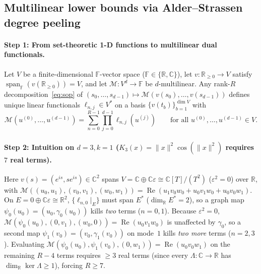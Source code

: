\documentclass[11pt,a4paper]{article}
\theoremstyle{plain}
\theoremstyle{definition}
\newcommand{\R}{\mathbb{R}}
\newcommand{\C}{\mathbb{C}}
\newcommand{\Field}{\mathbb{F}}
\newcommand{\Rnn}{\mathbb{R}_{\ge 0}}
\DeclareMathOperator{\RePart}{Re}
\DeclareMathOperator{\spanop}{span}
\begin{document}
\subsection{Multilinear lower bounds via Alder--Strassen degree peeling}\label{sec:lb}

\paragraph{Step 1: From set-theoretic 1-D functions to multilinear dual functionals.}
Let $V$ be a finite-dimensional $\Field$-vector space ($\Field \in \{\R, \C\}$), let $v : \Rnn \to V$ satisfy $\spanop_{\Field}(v(\Rnn)) = V$, and let $\mathcal{M} : V^d \to \Field$ be $d$-multilinear. Any rank-$R$ decomposition~\eqref{eq:sop} of $(s_0,\dots,s_{d-1}) \mapsto \mathcal{M}(v(s_0),\dots,v(s_{d-1}))$ defines unique linear functionals $\ell_{n,j} \in V^*$ on a basis $\{v(t_b)\}_{b=1}^{\dim V}$ with
\begin{equation}\label{eq:multilinear_decomp}
  \mathcal{M}(u^{(0)}, \dots, u^{(d-1)}) = \sum_{n=0}^{R-1} \prod_{j=0}^{d-1} \ell_{n,j}(u^{(j)}) \qquad \text{for all } u^{(0)}, \dots, u^{(d-1)} \in V.
\end{equation}

\paragraph{Step 2: Intuition on $d = 3, k = 1$ ($K_3(x) = \|x\|^2\cos(\|x\|^2)$ requires $7$ real terms).}
Here $v(s) = (e^{is}, s e^{is}) \in \C^2$ spans $V = \C \oplus \C\varepsilon \cong \C[T]/(T^2)$ ($\varepsilon^2 = 0$) over $\R$, with $\mathcal{M}((u_0, u_1), (v_0, v_1), (w_0, w_1)) = \RePart(u_1 v_0 w_0 + u_0 v_1 w_0 + u_0 v_0 w_1)$. On $E = 0 \oplus \C\varepsilon \cong \R^2$, $\{\ell_{n,0}|_E\}$ must span $E^*$ ($\dim_{\R} E^* = 2$), so a graph map $\psi_0(u_0) = (u_0, \gamma_0(u_0))$ kills \emph{two} terms ($n = 0, 1$). Because $\varepsilon^2 = 0$, $\mathcal{M}(\psi_0(u_0), (0, v_1), (w_0, 0)) = \RePart(u_0 v_1 w_0)$ is unaffected by $\gamma_0$, so a second map $\psi_1(v_0) = (v_0, \gamma_1(v_0))$ on mode~$1$ kills \emph{two more} terms ($n = 2, 3$). Evaluating $\mathcal{M}(\psi_0(u_0), \psi_1(v_0), (0, w_1)) = \RePart(u_0 v_0 w_1)$ on the remaining $R - 4$ terms requires $\ge 3$ real terms (since every $\Lambda : \C \to \R$ has $\dim_{\R}\ker\Lambda \ge 1$), forcing $R \ge 7$.
\end{document}
